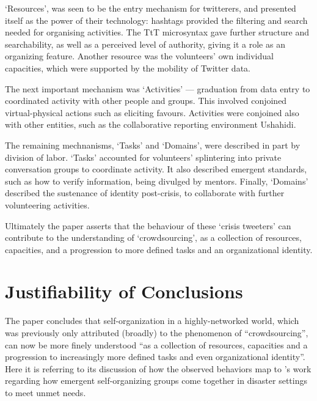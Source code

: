 \documentclass[a4paper,12pt]{article}
\begin{document}
`Resources', was seen to be the entry mechanism for twitterers, and presented itself as the power of their technology: hashtags provided the filtering and search needed for organising activities. The TtT microsyntax gave further structure and searchability, as well as a perceived level of authority, giving it a role as an organizing feature. Another resource was the volunteers' own individual capacities, which were supported by the mobility of Twitter data.

The next important mechanism was `Activities' --- graduation from data entry to coordinated activity with other people and groups. This involved conjoined virtual-physical actions such as eliciting favours. Activities were conjoined also with other entities, such as the collaborative reporting environment Ushahidi.

The remaining mechnanisms, `Tasks' and `Domains', were described in part by division of labor. `Tasks' accounted for volunteers' splintering into private conversation groups to coordinate activity. It also described emergent standards, such as how to verify information, being divulged by mentors. Finally, `Domains' described the sustenance of identity post-crisis, to collaborate with further volunteering activities.

Ultimately the paper asserts that the behaviour of these `crisis tweeters' can contribute to the understanding of `crowdsourcing', as a collection of resources, capacities, and a progression to more defined tasks and an organizational identity.

\section{Justifiability of Conclusions}
The paper concludes that self-organization in a highly-networked world, which was previously only attributed (broadly) to the phenomenon of ``crowdsourcing'', can now be more finely understood ``as a collection of resources, capacities and a progression to increasingly more defined tasks and even organizational identity''. Here it is referring to its discussion of how the observed behaviors map to \citeauthor{kreps1994organizing}'s work regarding how emergent self-organizing groups come together in disaster settings to meet unmet needs.
\end{document}
